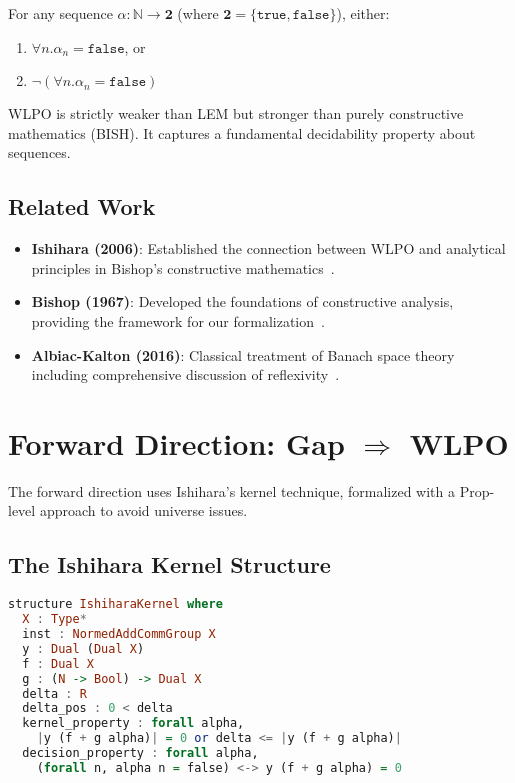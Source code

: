 \documentclass{lmcs}
\begin{document}
\begin{definition}[WLPO]
For any sequence $\alpha : \mathbb{N} \to \mathbf{2}$ (where $\mathbf{2} = \{\mathtt{true}, \mathtt{false}\}$), either:
\begin{enumerate}
\item $\forall n. \alpha_n = \mathtt{false}$, or
\item $\neg(\forall n. \alpha_n = \mathtt{false})$
\end{enumerate}
\end{definition}

WLPO is strictly weaker than LEM but stronger than purely constructive mathematics (BISH). It captures a fundamental decidability property about sequences.

\subsection{Related Work}

\begin{itemize}
\item \textbf{Ishihara (2006)}: Established the connection between WLPO and analytical principles in Bishop's constructive mathematics~\cite{Ishihara06}.
\item \textbf{Bishop (1967)}: Developed the foundations of constructive analysis, providing the framework for our formalization~\cite{Bishop67}.
\item \textbf{Albiac-Kalton (2016)}: Classical treatment of Banach space theory including comprehensive discussion of reflexivity~\cite{AlbiacKalton}.
\end{itemize}

\section{Forward Direction: Gap $\Rightarrow$ WLPO}\label{sec:forward}

The forward direction uses Ishihara's kernel technique, formalized with a Prop-level approach to avoid universe issues.

\subsection{The Ishihara Kernel Structure}

\begin{lstlisting}[language=Haskell, caption={Ishihara kernel formalization}]
structure IshiharaKernel where
  X : Type*
  inst : NormedAddCommGroup X
  y : Dual (Dual X)
  f : Dual X
  g : (N -> Bool) -> Dual X
  delta : R
  delta_pos : 0 < delta
  kernel_property : forall alpha, 
    |y (f + g alpha)| = 0 or delta <= |y (f + g alpha)|
  decision_property : forall alpha, 
    (forall n, alpha n = false) <-> y (f + g alpha) = 0
\end{lstlisting}
\end{document}
